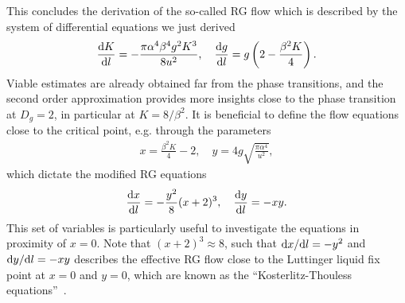 This concludes the derivation of the so-called RG flow which is described by the system of differential equations we just derived
\begin{align}
    \frac{\mathrm d K}{\mathrm d l} = -\frac{\pi \alpha^4 \beta^4 g^2 K^3}{8u^2},
    \quad
    \frac{\mathrm d g}{\mathrm d l} = g\left( 2-\frac{\beta^2K}4 \right).
\end{align}
Viable estimates are already obtained far from the phase transitions, and the second order approximation provides more insights close to the phase transition at $D_g=2$, in particular at $K=8/\beta^2$.
It is beneficial to define the flow equations close to the critical point, e.g. through the parameters
\begin{align}
    x = \frac{\beta^2 K}4 - 2,
    \quad
    y = 4g\sqrt{\frac{\pi\alpha^4}{u^2}},
\end{align}
which dictate the modified RG equations
\begin{align}
    \frac{\mathrm d x}{\mathrm d l} = -\frac{y^2}8(x+2)^3,
    \quad
    \frac{\mathrm d y}{\mathrm d l} = - xy.
\end{align}
This set of variables is particularly useful to investigate the equations in proximity of $x=0$.
Note that $(x+2)^3\approx8$, such that $\mathrm d x/\mathrm d l = -y^2$ and $\mathrm d y/\mathrm d l=-xy$ describes the effective RG flow close to the Luttinger liquid fix point at $x=0$ and $y=0$, which are known as the ``Kosterlitz-Thouless equations''~\cite{Kosterlitz1974,Kosterlitz1973}.

